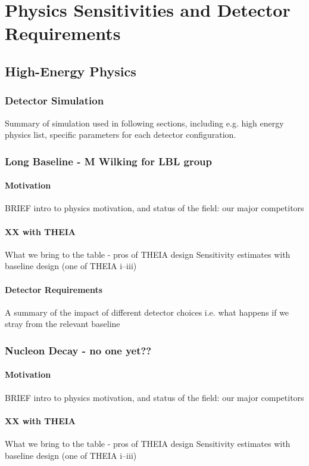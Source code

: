 \documentclass[11pt,prd,letterpaper,amsmath,amssymb,final,nofootinbib
,unsortedaddress,superscriptaddress
]{revtex4-1}
\begin{document}
\section{Physics Sensitivities and Detector Requirements}\label{s:physics}



\subsection{High-Energy Physics}
\subsubsection{Detector Simulation}
Summary of simulation used in following sections, including e.g. high energy physics list, specific parameters for each detector configuration.
\subsubsection{Long Baseline - M Wilking for LBL group}
\paragraph{Motivation}
BRIEF intro to physics motivation, and status of the field: our major competitors
\paragraph{XX with THEIA}
What we bring to the table - pros of THEIA design \newline
Sensitivity estimates with baseline design (one of THEIA i--iii)
\paragraph{Detector Requirements}
A summary of the impact of different detector choices i.e. what happens if we stray from the relevant baseline
\subsubsection{Nucleon Decay - no one yet??}
\paragraph{Motivation}
BRIEF intro to physics motivation, and status of the field: our major competitors
\paragraph{XX with THEIA}
What we bring to the table - pros of THEIA design \newline
Sensitivity estimates with baseline design (one of THEIA i--iii)
\end{document}
